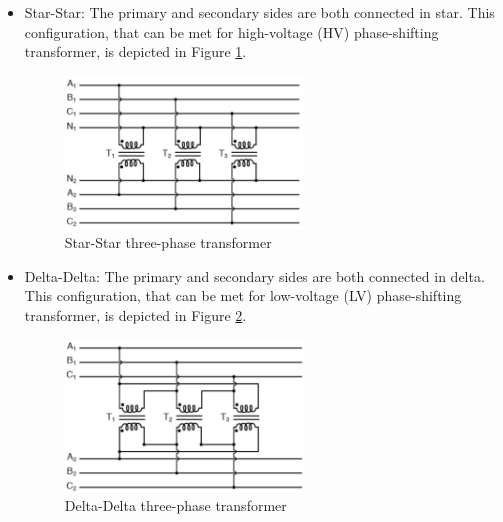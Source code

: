 \documentclass[12pt,a4paper]{report}
\begin{document}
\begin{itemize}
    \item Star-Star: The primary and secondary sides are both connected in star. This configuration, that can be met for high-voltage (HV) phase-shifting transformer, is depicted in Figure \ref{fig:star-star transformer}. 
    \begin{figure}[h]
    \centering
    \includegraphics[width=0.6\textwidth]{y-y.PNG}
    \caption{Star-Star three-phase transformer}
    \label{fig:star-star transformer}
    \end{figure}
    
    \item Delta-Delta: The primary and secondary sides are both connected in delta. This configuration, that can be met for low-voltage (LV) phase-shifting transformer, is depicted in Figure \ref{fig:delta-delta transformer}. 
    \begin{figure}[h]
    \centering
    \includegraphics[width=0.6\textwidth]{delta-delta.PNG}
    \caption{Delta-Delta three-phase transformer}
    \label{fig:delta-delta transformer}
    \end{figure}
\end{itemize}
\newpage
\end{document}
